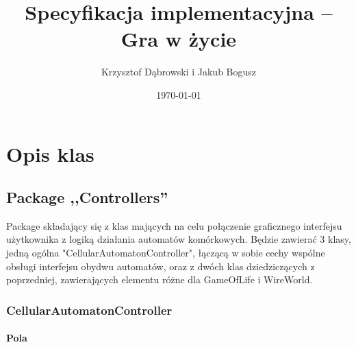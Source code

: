 \documentclass{report}
\title{Specyfikacja implementacyjna -- Gra w życie}
\author{Krzysztof Dąbrowski i Jakub Bogusz}
\date{\today}
\begin{document}
\maketitle{}

\tableofcontents{}

\chapter{Opis klas}

\section{Package ,,Controllers''}
Package składający się z klas mających na celu połączenie graficznego interfejsu użytkownika z logiką działania automatów komórkowych. Będzie zawierać 3 klasy, jedną ogólna "CellularAutomatonController", łączącą w sobie cechy wspólne obsługi interfejsu obydwu automatów, oraz z dwóch klas dziedziczących z poprzedniej, zawierających elementu różne dla GameOfLife i WireWorld.

\subsection{CellularAutomatonController}
\subsubsection{Pola}
\end{document}
